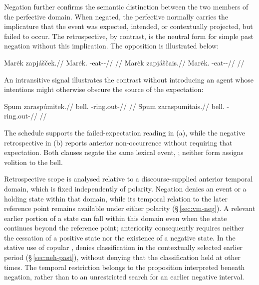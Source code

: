 Negation further confirms the semantic distinction between the two members of
the perfective domain. When negated, the perfective normally carries the
implicature that the event was expected, intended, or contextually projected,
but failed to occur. The retrospective, by contrast, is the neutral form for
simple past negation without this implication. The opposition is illustrated
below:

\pex
\a
\begingl
\gla Marėk zapjášček.//
\glb Marėk.\Dir{} \Neg{}-eat-\Antip{}-\Pf{}//
\glft {}//
\endgl
\a
\begingl
\gla Marėk zapjáščais.//
\glb Marėk.\Dir{} \Neg{}-eat-\Antip{}-\Ret{}//
\glft {}//
\endgl
\xe

An intransitive signal illustrates the contrast without introducing an
agent whose intentions might otherwise obscure the source of the expectation:

\pex\label{ex:vm-slot-negative-expectation}
\a
\begingl
\gla Spum zaraspúmitek.//
\glb bell.\Dir{} \Neg{}-ring.out-\Pf{}//
\glft {}
//
\endgl
\a
\begingl
\gla Spum zaraspumitais.//
\glb bell.\Dir{} \Neg{}-ring.out-\Ret{}//
\glft {}
//
\endgl
\xe

The schedule supports the failed-expectation reading in (a), while the
negative retrospective in (b) reports anterior non-occurrence without
requiring that expectation. Both clauses negate the same lexical event,
; neither form assigns volition to the bell.

Retrospective scope is analysed relative to a discourse-supplied anterior
temporal domain, which is fixed independently of polarity. Negation denies
an event or a holding state within that domain, while its temporal relation
to the later reference point remains available under either polarity
(§\,\ref{sec:vm-neg}). A relevant earlier portion of a state can fall
within this domain even when the state continues beyond the reference point;
anteriority consequently requires neither the cessation of a positive state
nor the existence of a negative state. In the stative use of copular
,  denies classification in the contextually
selected earlier period (§\,\ref{sec:neh-past}), without denying that
the classification held at other times. The temporal restriction
belongs to the proposition interpreted beneath negation, rather than to
an unrestricted search for an earlier negative interval.

